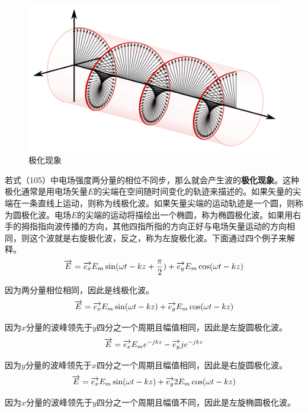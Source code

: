 \documentclass[UTF8,a4paper,11pt]{article}
\begin{document}
\begin{figure}[htbp]
\centering
\includegraphics[scale=0.3]{p15.png}
\caption{极化现象}
\end{figure}
若式（105）中电场强度两分量的相位不同步，那么就会产生波的\textbf{极化现象}。这种极化通常是用电场矢量$E$的尖端在空间随时间变化的轨迹来描述的。如果矢量的尖端在一条直线上运动，则称为线极化波。如果矢量尖端的运动轨迹是一个圆，则称为圆极化波。电场$E$的尖端的运动将描绘出一个椭圆，称为椭圆极化波。如果用右手的拇指指向波传播的方向，其他四指所指的方向正好与电场矢量运动的方向相同，则这个波就是右旋极化波，反之，称为左旋极化波。下面通过四个例子来解释。
\begin{equation}
\overrightarrow{E}=\overrightarrow{e_x}E_m\sin(\omega t-kz+\frac{\pi}{2})+\overrightarrow{e_y}E_m\cos(\omega t-kz)
\notag
\end{equation}

因为两分量相位相同，因此是线极化波。
\begin{equation}
\overrightarrow{E}=\overrightarrow{e_x}E_m\sin(\omega t-kz)+\overrightarrow{e_y}E_m\cos(\omega t-kz)
\notag
\end{equation}

因为$x$分量的波峰领先于$y$四分之一个周期且幅值相同，因此是左旋圆极化波。
\begin{equation}
\overrightarrow{E}=\overrightarrow{e_x}E_me^{-jkz}-\overrightarrow{e_y}je^{-jkz}
\notag
\end{equation}

因为$y$分量的波峰领先于$x$四分之一个周期且幅值相同，因此是右旋圆极化波。
\begin{equation}
\overrightarrow{E}=\overrightarrow{e_x}E_m\sin(\omega t-kz)+\overrightarrow{e_y}2E_m\cos(\omega t-kz)
\notag
\end{equation}

因为$x$分量的波峰领先于$y$四分之一个周期且幅值不同，因此是左旋椭圆极化波。
\end{document}
